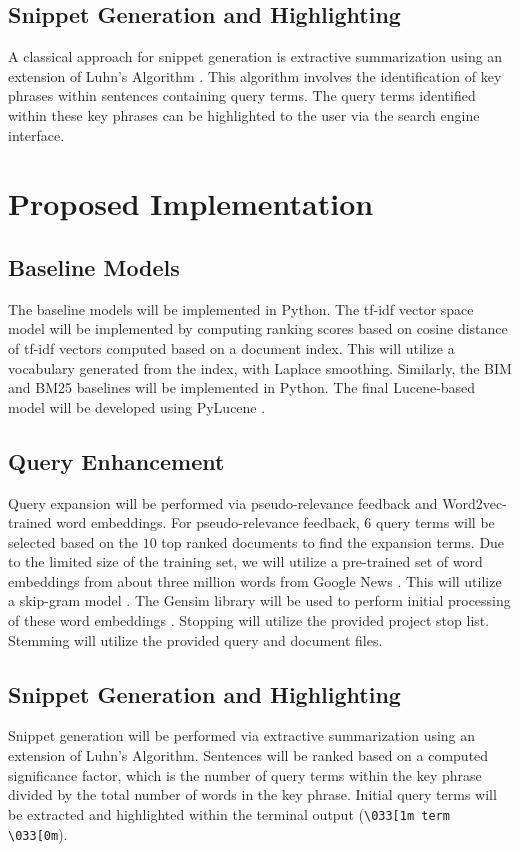 \documentclass[conference]{IEEEtran}
\begin{document}
\subsection{Snippet Generation and Highlighting}
A classical approach for snippet generation is extractive summarization using an extension of Luhn's Algorithm \cite{luhn1958automatic}. This algorithm involves the identification of key phrases within sentences containing query terms. The query terms identified within these key phrases can be highlighted to the user via the search engine interface.

\section{Proposed Implementation}
\subsection{Baseline Models}
The baseline models will be implemented in Python. The tf-idf vector space model will be implemented by computing ranking scores based on cosine distance of tf-idf vectors computed based on a document index. This will utilize a vocabulary generated from the index, with Laplace smoothing. Similarly, the BIM and BM25 baselines will be implemented in Python. The final Lucene-based model will be developed using PyLucene \cite{vajda2005pulling}.

\subsection{Query Enhancement}
Query expansion will be performed via pseudo-relevance feedback and Word2vec-trained \cite{mikolov2015computing} word embeddings. For pseudo-relevance feedback, $6$ query terms will be selected based on the $10$ top ranked documents to find the expansion terms. Due to the limited size of the training set, we will utilize a pre-trained set of word embeddings from about three million words from Google News \cite{mikolov2013distributed}. This will utilize a skip-gram model \cite{mikolov2013distributed}. The Gensim library will be used to perform initial processing of these word embeddings \cite{rehurek_lrec}. Stopping will utilize the provided project stop list. Stemming will utilize the provided query and document files.

\subsection{Snippet Generation and Highlighting}
Snippet generation will be performed via extractive summarization using an extension of Luhn's Algorithm. Sentences will be ranked based on a computed significance factor, which is the number of query terms within the key phrase divided by the total number of words in the key phrase. Initial query terms will be extracted and highlighted within the terminal output (\verb|\033[1m term \033[0m|).
\end{document}
